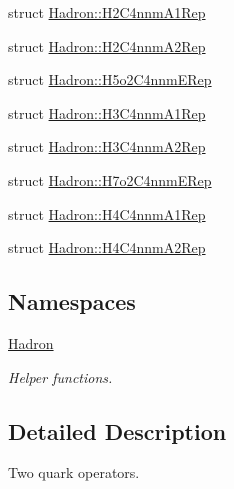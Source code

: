 \begin{DoxyCompactItemize}
struct \mbox{\hyperlink{structHadron_1_1H2C4nnmA1Rep}{Hadron\+::\+H2\+C4nnm\+A1\+Rep}}
\item 
struct \mbox{\hyperlink{structHadron_1_1H2C4nnmA2Rep}{Hadron\+::\+H2\+C4nnm\+A2\+Rep}}
\item 
struct \mbox{\hyperlink{structHadron_1_1H5o2C4nnmERep}{Hadron\+::\+H5o2\+C4nnm\+E\+Rep}}
\item 
struct \mbox{\hyperlink{structHadron_1_1H3C4nnmA1Rep}{Hadron\+::\+H3\+C4nnm\+A1\+Rep}}
\item 
struct \mbox{\hyperlink{structHadron_1_1H3C4nnmA2Rep}{Hadron\+::\+H3\+C4nnm\+A2\+Rep}}
\item 
struct \mbox{\hyperlink{structHadron_1_1H7o2C4nnmERep}{Hadron\+::\+H7o2\+C4nnm\+E\+Rep}}
\item 
struct \mbox{\hyperlink{structHadron_1_1H4C4nnmA1Rep}{Hadron\+::\+H4\+C4nnm\+A1\+Rep}}
\item 
struct \mbox{\hyperlink{structHadron_1_1H4C4nnmA2Rep}{Hadron\+::\+H4\+C4nnm\+A2\+Rep}}
\end{DoxyCompactItemize}
\subsection*{Namespaces}
\begin{DoxyCompactItemize}
\item 
 \mbox{\hyperlink{namespaceHadron}{Hadron}}
\begin{DoxyCompactList}\small\item\em Helper functions. \end{DoxyCompactList}\end{DoxyCompactItemize}


\subsection{Detailed Description}
Two quark operators. 

